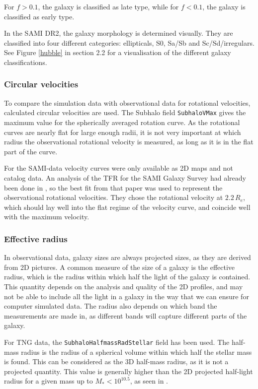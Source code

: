 For $f > 0.1$, the galaxy is classified as late type, while for $f< 0.1$, the galaxy is classified as early type.

In the SAMI DR2, the galaxy morphology is determined visually. They are classified into four different categories: ellipticals, S0, Sa/Sb and Sc/Sd/irregulars. See Figure \ref{hubble} in section 2.2 for a visualisation of the different galaxy classifications.

\subsubsection{Circular velocities}
To compare the simulation data with observational data for rotational velocities, calculated circular velocities are used. The Subhalo field \texttt{SubhaloVMax} gives the maximum value for the spherically averaged rotation curve. As the rotational curves are nearly flat for large enough radii, it is not very important at which radius the observational rotational velocity is measured, as long as it is in the flat part of the curve. 

For the SAMI-data velocity curves were only available as 2D maps and not catalog data. An analysis of the TFR for the SAMI Galaxy Survey had already been done in \cite{Bloom2017}, so the best fit from that paper was used to represent the observational rotational velocities. They chose the rotational velocity at $2.2\, R_e$, which should lay well into the flat regime of the velocity curve, and coincide well with the maximum velocity.


\subsubsection{Effective radius}
In observational data, galaxy sizes are always projected sizes, as they are derived from 2D pictures. A common measure of the size of a galaxy is the effective radius, which is the radius within which half the light of the galaxy is contained. This quantity depends on the analysis and quality of the 2D profiles, and may not be able to include all the light in a galaxy in the way that we can ensure for computer simulated data. The radius also depends on which band the measurements are made in, as different bands will capture different parts of the galaxy.

For TNG data, the \texttt{SubhaloHalfmassRadStellar} field has been used. The half-mass radius is the radius of a spherical volume within which half the stellar mass is found. This can be considered as the 3D half-mass radius, as it is not a projected quantity. This value is generally higher than the 2D projected half-light radius for a given mass up to $M_{*} < 10^{10.5}$, as seen in \parencite{Genel2017}.


